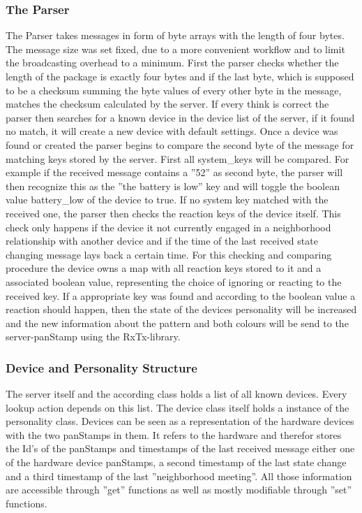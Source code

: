 \subsubsection{The Parser}
The Parser takes messages in form of byte arrays with the length of four bytes. The message size was set fixed, due to a more convenient workflow and to limit the broadcasting overhead to a minimum. 
First the parser checks whether the length of the package is exactly four bytes and if the last byte, which is supposed to be a checksum summing the byte values of every other byte in the message, matches the checksum calculated by the server. If every think is correct the parser then searches for a known device in the device list of the server, if it found no match, it will create a new device with default settings. Once a device was found or created the parser begins to compare the second byte of the message for matching keys stored by the server. First all system\_keys will be compared. For example if the received message contains a ''52'' as second byte, the parser will then recognize this as the ''the battery is low'' key and will toggle the boolean value battery\_low of the device to true. 
If no system key matched with the received one, the parser then checks the reaction keys of the device itself. This check only happens if the device it not currently engaged in a neighborhood relationship with another device and if the time of the last received state changing message lays back a certain time. For this checking and comparing procedure the device owns a map with all reaction keys stored to it and a associated boolean value, representing the choice of ignoring or reacting to the received key. If a appropriate key was found and according to the boolean value a reaction should happen, then the state of the devices personality will be increased and the new information about the pattern and both colours will be send to the server-panStamp using the RxTx-library.

\subsubsection{Device and Personality Structure}
The server itself and the according class holds a list of all known devices. Every lookup action depends on this list. The device class itself holds a instance of the personality class.
Devices can be seen as a representation of the hardware devices with the two panStamps in them. It refers to the hardware and therefor stores the Id's of the panStamps and timestamps of the last received message either one of the hardware device panStamps, a second timestamp of the last state change and a third timestamp of the last ''neighborhood meeting''. All those information are accessible through ''get'' functions as well as mostly modifiable through ''set'' functions.

